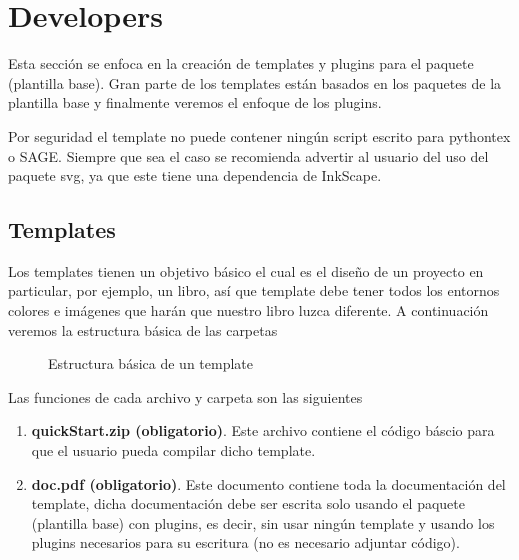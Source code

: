 {	\section{Developers}
	Esta sección se enfoca en la creación de templates y plugins para el paquete \printproject\space (plantilla base). Gran parte de los templates están basados en los paquetes de la plantilla base y finalmente veremos el enfoque de los plugins.
	\begin{boxbasic}[Nota]
		Por seguridad el template no puede contener ningún script escrito para pythontex o SAGE. Siempre que sea el caso se recomienda advertir al usuario del uso del paquete svg, ya que este tiene una dependencia de InkScape. 
	\end{boxbasic}
	\subsection{Templates}
	Los templates tienen un objetivo básico el cual es el diseño de un proyecto en particular, por ejemplo, un libro, así que template debe tener todos los entornos colores e imágenes que harán que nuestro libro luzca diferente. A continuación veremos la estructura básica de las carpetas
	\begin{figure}[H]
		\caption{Estructura básica de un template}
		\label{fig:EstructuraTemplate}
	\end{figure} 
	Las funciones de cada archivo y carpeta son las siguientes
	\begin{enumerate}
		\item \textbf{quickStart.zip (obligatorio)}. Este archivo contiene el código báscio para que el usuario pueda compilar dicho template.
		\item \textbf{doc.pdf (obligatorio)}. Este documento contiene toda la documentación del template, dicha documentación debe ser escrita solo usando el paquete \printproject\space (plantilla base) con plugins, es decir, sin usar ningún template y usando los plugins necesarios para su escritura (no es necesario adjuntar código).

\end{enumerate}}
